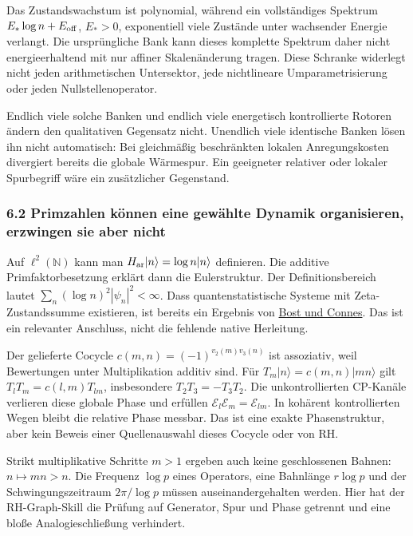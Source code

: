 Das Zustandswachstum ist polynomial, während ein vollständiges Spektrum
\(E_*\log n+E_{\rm off}\), \(E_*>0\), exponentiell viele Zustände unter
wachsender Energie verlangt. Die ursprüngliche Bank kann dieses
komplette Spektrum daher nicht energieerhaltend mit nur affiner
Skalenänderung tragen. Diese Schranke widerlegt nicht jeden
arithmetischen Untersektor, jede nichtlineare Umparametrisierung oder
jeden Nullstellenoperator.

Endlich viele solche Banken und endlich viele energetisch kontrollierte
Rotoren ändern den qualitativen Gegensatz nicht. Unendlich viele
identische Banken lösen ihn nicht automatisch: Bei gleichmäßig
beschränkten lokalen Anregungskosten divergiert bereits die globale
Wärmespur. Ein geeigneter relativer oder lokaler Spurbegriff wäre ein
zusätzlicher Gegenstand.

\subsubsection{6.2 Primzahlen können eine gewählte Dynamik organisieren,
erzwingen sie aber
nicht}\label{primzahlen-kuxf6nnen-eine-gewuxe4hlte-dynamik-organisieren-erzwingen-sie-aber-nicht}

Auf \(\ell^2(\mathbb N)\) kann man
\(H_{\rm ar}|n\rangle=\log n|n\rangle\) definieren. Die additive
Primfaktorbesetzung erklärt dann die Eulerstruktur. Der
Definitionsbereich lautet \(\sum_n(\log n)^2|\psi_n|^2<\infty\). Dass
quantenstatistische Systeme mit Zeta-Zustandssumme existieren, ist
bereits ein Ergebnis von
\href{https://alainconnes.org/wp-content/uploads/bostconnesscan.pdf}{Bost
und Connes}. Das ist ein relevanter Anschluss, nicht die fehlende native
Herleitung.

Der gelieferte Cocycle \(c(m,n)=(-1)^{v_2(m)v_3(n)}\) ist assoziativ,
weil Bewertungen unter Multiplikation additiv sind. Für
\(T_m|n\rangle=c(m,n)|mn\rangle\) gilt \(T_lT_m=c(l,m)T_{lm}\),
insbesondere \(T_2T_3=-T_3T_2\). Die unkontrollierten CP-Kanäle
verlieren diese globale Phase und erfüllen
\(\mathcal E_l\mathcal E_m=\mathcal E_{lm}\). In kohärent kontrollierten
Wegen bleibt die relative Phase messbar. Das ist eine exakte
Phasenstruktur, aber kein Beweis einer Quellenauswahl dieses Cocycle
oder von RH.

Strikt multiplikative Schritte \(m>1\) ergeben auch keine geschlossenen
Bahnen: \(n\mapsto mn>n\). Die Frequenz \(\log p\) eines Operators, eine
Bahnlänge \(r\log p\) und der Schwingungszeitraum \(2\pi/\log p\) müssen
auseinandergehalten werden. Hier hat der RH-Graph-Skill die Prüfung auf
Generator, Spur und Phase getrennt und eine bloße Analogieschließung
verhindert.

